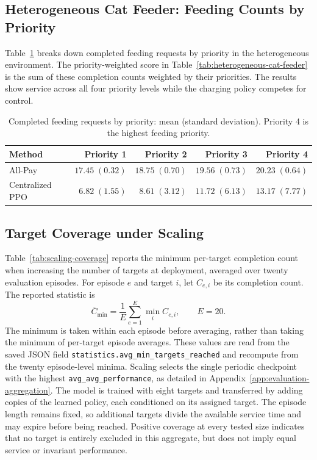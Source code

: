 \subsection{Heterogeneous Cat Feeder: Feeding Counts by Priority}
\label{app:heterogeneous-results}
Table~\ref{tab:priority-feeding-counts} breaks down completed feeding requests by priority in the heterogeneous environment.
The priority-weighted score in Table~\ref{tab:heterogeneous-cat-feeder} is the sum of these completion counts weighted by their priorities.
The results show service across all four priority levels while the charging policy competes for control.

\begin{table}[ht]
  \caption{Completed feeding requests by priority: mean (standard deviation). Priority 4 is the highest feeding priority.}
  \label{tab:priority-feeding-counts}
  \centering
  \begin{tabular}{lrrrr}
    \toprule
    Method & Priority 1 & Priority 2 & Priority 3 & Priority 4 \\
    \midrule
    All-Pay & $17.45\;(0.32)$ & $18.75\;(0.70)$ & $19.56\;(0.73)$ & $20.23\;(0.64)$ \\
    Centralized PPO & $6.82\;(1.55)$ & $8.61\;(3.12)$ & $11.72\;(6.13)$ & $13.17\;(7.77)$ \\
    \bottomrule
  \end{tabular}
\end{table}

\subsection{Target Coverage under Scaling}
\label{app:scaling-coverage}
Table~\ref{tab:scaling-coverage} reports the minimum per-target completion count when increasing the number of targets at deployment, averaged over twenty evaluation episodes.
For episode $e$ and target $i$, let $C_{e,i}$ be its completion count.
The reported statistic is
\begin{equation}
  \overline C_{\min}=\frac{1}{E}\sum_{e=1}^{E}\min_i C_{e,i},
  \qquad E=20.
\end{equation}
The minimum is taken within each episode before averaging, rather than taking the minimum of per-target episode averages.
These values are read from the saved JSON field \texttt{statistics.avg\_min\_targets\_reached} and recompute from the twenty episode-level minima.
Scaling selects the single periodic checkpoint with the highest \texttt{avg\_avg\_performance}, as detailed in Appendix~\ref{app:evaluation-aggregation}.
The model is trained with eight targets and transferred by adding copies of the learned policy, each conditioned on its assigned target.
The episode length remains fixed, so additional targets divide the available service time and may expire before being reached.
Positive coverage at every tested size indicates that no target is entirely excluded in this aggregate, but does not imply equal service or invariant performance.

